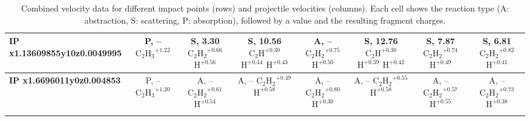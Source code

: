 \begin{table}[t]
\begin{tabular}{lccccccc}
\midrule
\textbf{IP x1.13609855y10z0.0049995} & \makecell{P, -- \\ $\mathrm{C_2H_3}^{+1.22}$} & \makecell{S, 3.30 \\ $\mathrm{C_2H_2}^{+0.66}$ \\ $\mathrm{H}^{+0.56}$} & \makecell{S, 10.56 \\ $\mathrm{C_2H}^{+0.30}$ \\ $\mathrm{H}^{+0.44}$ \\ $\mathrm{H}^{+0.43}$} & \makecell{A, -- \\ $\mathrm{C_2H_2}^{+0.75}$ \\ $\mathrm{H}^{+0.50}$} & \makecell{S, 12.76 \\ $\mathrm{C_2H}^{+0.30}$ \\ $\mathrm{H}^{+0.39}$ \\ $\mathrm{H}^{+0.42}$} & \makecell{S, 7.87 \\ $\mathrm{C_2H_2}^{+0.74}$ \\ $\mathrm{H}^{+0.49}$} & \makecell{S, 6.81 \\ $\mathrm{C_2H_2}^{+0.82}$ \\ $\mathrm{H}^{+0.41}$} \\
\midrule
\textbf{IP x1.6696011y0z0.004853} & \makecell{P, -- \\ $\mathrm{C_2H_3}^{+1.20}$} & \makecell{A, -- \\ $\mathrm{C_2H_2}^{+0.61}$ \\ $\mathrm{H}^{+0.54}$} & \makecell{A, -- \\ $\mathrm{C_2H_2}^{+0.49}$ \\ $\mathrm{H}^{+0.58}$} & \makecell{A, -- \\ $\mathrm{C_2H_2}^{+0.80}$ \\ $\mathrm{H}^{+0.30}$} & \makecell{A, -- \\ $\mathrm{C_2H_2}^{+0.55}$ \\ $\mathrm{H}^{+0.58}$} & \makecell{A, -- \\ $\mathrm{C_2H_2}^{+0.57}$ \\ $\mathrm{H}^{+0.55}$} & \makecell{A, -- \\ $\mathrm{C_2H_2}^{+0.73}$ \\ $\mathrm{H}^{+0.38}$} \\
\midrule
\arrayrulecolor{black}
\bottomrule
\end{tabular}
\caption{Combined velocity data for different impact points (rows) and projectile velocities (columns). Each cell shows the reaction type (A: abstraction, S: scattering, P: absorption), followed by a value and the resulting fragment charges.}
\label{tab:combined_velocity_data}
\end{table}
